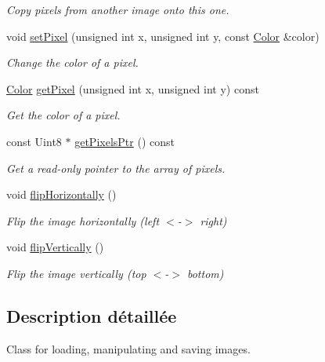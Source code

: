 \begin{DoxyCompactItemize}
\begin{DoxyCompactList}\small\item\em Copy pixels from another image onto this one. \end{DoxyCompactList}\item 
void \hyperlink{classsf_1_1Image_a9fd329b8cd7d4439e07fb5d3bb2d9744}{set\+Pixel} (unsigned int x, unsigned int y, const \hyperlink{classsf_1_1Color}{Color} \&color)
\begin{DoxyCompactList}\small\item\em Change the color of a pixel. \end{DoxyCompactList}\item 
\hyperlink{classsf_1_1Color}{Color} \hyperlink{classsf_1_1Image_acf278760458433b2c3626a6980388a95}{get\+Pixel} (unsigned int x, unsigned int y) const
\begin{DoxyCompactList}\small\item\em Get the color of a pixel. \end{DoxyCompactList}\item 
const Uint8 $\ast$ \hyperlink{classsf_1_1Image_ad9562b126fc8d5efcf608166992865c7}{get\+Pixels\+Ptr} () const
\begin{DoxyCompactList}\small\item\em Get a read-\/only pointer to the array of pixels. \end{DoxyCompactList}\item 
\mbox{\label{classsf_1_1Image_a57168e7bc29190e08bbd6c9c19f4bb2c}} 
void \hyperlink{classsf_1_1Image_a57168e7bc29190e08bbd6c9c19f4bb2c}{flip\+Horizontally} ()
\begin{DoxyCompactList}\small\item\em Flip the image horizontally (left $<$-\/$>$ right) \end{DoxyCompactList}\item 
\mbox{\label{classsf_1_1Image_a78a702a7e49d1de2dec9894da99d279c}} 
void \hyperlink{classsf_1_1Image_a78a702a7e49d1de2dec9894da99d279c}{flip\+Vertically} ()
\begin{DoxyCompactList}\small\item\em Flip the image vertically (top $<$-\/$>$ bottom) \end{DoxyCompactList}\end{DoxyCompactItemize}


\subsection{Description détaillée}
Class for loading, manipulating and saving images. 

